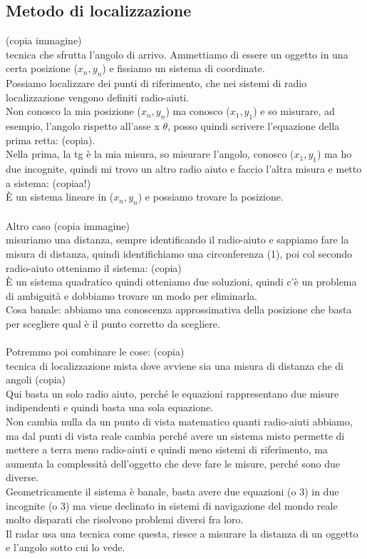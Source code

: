 \documentclass[oneside, 12pt]{extbook}
\begin{document}
\subsection{Metodo di localizzazione}
(copia immagine)\\
tecnica che sfrutta l'angolo di arrivo. Ammettiamo di essere un oggetto in una certa posizione ($x_n, y_n$) e fissiamo un sistema di coordinate.\\
Possiamo localizzare dei punti di riferimento, che nei sistemi di radio localizzazione vengono definiti radio-aiuti.\\
Non conosco la mia posizione ($x_n, y_n$) ma conosco ($x_1, y_1$) e so misurare, ad esempio, l'angolo rispetto all'asse x $\theta$, posso quindi scrivere l'equazione della prima retta: (copia).\\
Nella prima, la tg è la mia misura, so misurare l'angolo, conosco ($x_1, y_1$) ma ho due incognite, quindi mi trovo un altro radio aiuto e faccio l'altra misura e metto a sistema: (copiaa!)\\
È un sistema lineare in ($x_n, y_n$) e possiamo trovare la posizione.\\\\
Altro caso (copia immagine)
\\misuriamo una distanza, sempre identificando il radio-aiuto e sappiamo fare la misura di distanza, quindi identifichiamo una circonferenza (1), poi col secondo radio-aiuto otteniamo il sistema:
(copia)\\
È un sistema quadratico quindi otteniamo due soluzioni, quindi c'è un problema di ambiguità e dobbiamo trovare un modo per eliminarla.\\
Cosa banale: abbiamo una conoscenza approssimativa della posizione che basta per scegliere qual è il punto corretto da scegliere.\\\\
Potremmo poi combinare le cose: (copia)
\\tecnica di localizzazione mista dove avviene sia una misura di distanza che di angoli (copia)
\\Qui basta un solo radio aiuto, perché le equazioni rappresentano due misure indipendenti e quindi basta una sola equazione.\\
Non cambia nulla da un punto di vista matematico quanti radio-aiuti abbiamo, ma dal punti di vista reale cambia perché avere un sistema misto permette di mettere a terra meno radio-aiuti e quindi meno sistemi di riferimento, ma aumenta la complessità dell'oggetto che deve fare le misure, perché sono due diverse.\\
Geometricamente il sistema è banale, basta avere due equazioni (o 3) in due incognite (o 3) ma viene declinato in sistemi di navigazione del mondo reale molto disparati che risolvono problemi diversi fra loro.\\
Il radar usa una tecnica come questa, riesce a misurare la distanza di un oggetto e l'angolo sotto cui lo vede.
\end{document}
